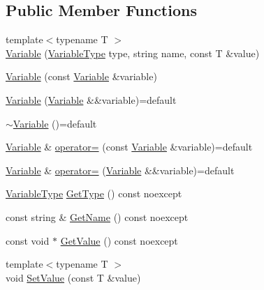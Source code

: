 \subsection*{Public Member Functions}
\begin{DoxyCompactItemize}
\item 
{\footnotesize template$<$typename T $>$ }\\\hyperlink{structmage_1_1_variable_a31348c3a159ff671ab2d36fc089c3b3d}{Variable} (\hyperlink{namespacemage_a530428e73bac0ba7fe84b29086a9e33a}{Variable\+Type} type, string name, const T \&value)
\item 
\hyperlink{structmage_1_1_variable_a778d347a0d63771cbaac45bcba594792}{Variable} (const \hyperlink{structmage_1_1_variable}{Variable} \&variable)
\item 
\hyperlink{structmage_1_1_variable_a49764740130a9b06033869fff0b634a9}{Variable} (\hyperlink{structmage_1_1_variable}{Variable} \&\&variable)=default
\item 
\hyperlink{structmage_1_1_variable_a7503f010f296683cecf9be65a3f86589}{$\sim$\+Variable} ()=default
\item 
\hyperlink{structmage_1_1_variable}{Variable} \& \hyperlink{structmage_1_1_variable_a461893d21d4a48a548b1df5a89c58793}{operator=} (const \hyperlink{structmage_1_1_variable}{Variable} \&variable)=default
\item 
\hyperlink{structmage_1_1_variable}{Variable} \& \hyperlink{structmage_1_1_variable_aec9505fabbafb48e9fcbf9d9213147ce}{operator=} (\hyperlink{structmage_1_1_variable}{Variable} \&\&variable)=default
\item 
\hyperlink{namespacemage_a530428e73bac0ba7fe84b29086a9e33a}{Variable\+Type} \hyperlink{structmage_1_1_variable_a7a08695051144936e1bdf1c762c148d7}{Get\+Type} () const noexcept
\item 
const string \& \hyperlink{structmage_1_1_variable_a23003aa97e07342b201068a041571d77}{Get\+Name} () const noexcept
\item 
const void $\ast$ \hyperlink{structmage_1_1_variable_a2ca2f704f2234425bbc751bc76a16ca5}{Get\+Value} () const noexcept
\item 
{\footnotesize template$<$typename T $>$ }\\void \hyperlink{structmage_1_1_variable_ab3b2bfdc631a8174c9a5c0360a4fee30}{Set\+Value} (const T \&value)
\end{DoxyCompactItemize}
